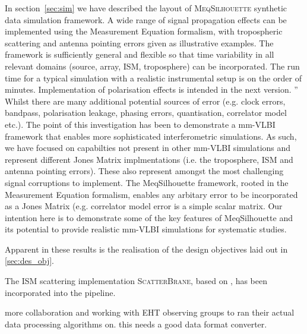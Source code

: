 In section~\ref{sec:sim} we have described the layout of \textsc{MeqSilhouette} synthetic data simulation framework. A wide range of signal propagation effects can be implemented using the Measurement Equation formalism, with tropospheric scattering and antenna pointing errors given as illustrative examples. The framework is sufficiently general and flexible so that time variability in all relevant domains (source, array, ISM, troposphere) can be incorporated. The run time for a typical simulation with a realistic instrumental setup is on the order of minutes.  Implementation of polarisation effects is intended in the next version. 
''\\
Whilst there are many additional potential sources of error (e.g. clock errors, bandpass, polarisation leakage, phasing errors, quantisation, correlator model etc.). The point of this investigation has been to demonstrate a mm-VLBI framework that enables more sophisticated interferometric simulations. As such, we have focused on capabilties not present in other mm-VLBI simulations and represent different Jones Matrix implmentations (i.e. the troposphere, ISM and antenna pointing errors). These also represent amongst the most challenging signal corruptions to implement. The MeqSilhouette framework, rooted in the Measurement Equation formalism, enables any arbitary error to be incorporated as a Jones Matrix (e.g. correlator model error is a simple scalar matrix. Our intention here is to demonstrate some of the key features of MeqSilhouette and its potential to provide realistic mm-VLBI simulations for systematic studies.

Apparent in these results is the realisation of the design objectives laid out in \ref{sec:des_obj}.

The ISM scattering implementation \textsc{ScatterBrane}, based on \citet*{Johnson_2015a}, has been incorporated into the pipeline.

more collaboration and working with EHT observing groups to ran their actual data processing algorithms on. this needs a good data format converter. 



